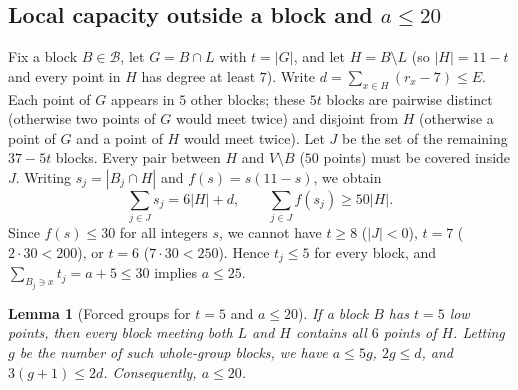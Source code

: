 \documentclass[11pt,a4paper]{article}
\newtheorem{lemma}[theorem]{Lemma}
\theoremstyle{definition}
\theoremstyle{remark}
\begin{document}
\subsection{Local capacity outside a block and \texorpdfstring{$a \le 20$}{a <= 20}}\label{sec:t_le_5}

Fix a block $B \in \mathcal{B}$, let $G = B \cap L$ with $t = |G|$, and let $H = B \setminus L$ (so $|H| = 11 - t$ and every point in $H$ has degree at least $7$). Write $d = \sum_{x \in H} (r_x - 7) \le E$. Each point of $G$ appears in $5$ other blocks; these $5t$ blocks are pairwise distinct (otherwise two points of $G$ would meet twice) and disjoint from $H$ (otherwise a point of $G$ and a point of $H$ would meet twice). Let $J$ be the set of the remaining $37 - 5t$ blocks. Every pair between $H$ and $V \setminus B$ ($50$ points) must be covered inside $J$. Writing $s_j = |B_j \cap H|$ and $f(s) = s(11 - s)$, we obtain
\begin{equation}\label{eq:local_cap}
  \sum_{j \in J} s_j = 6|H| + d, \qquad \sum_{j \in J} f(s_j) \ge 50|H|.
\end{equation}
Since $f(s) \le 30$ for all integers $s$, we cannot have $t \ge 8$ ($|J| < 0$), $t = 7$ ($2 \cdot 30 < 200$), or $t = 6$ ($7 \cdot 30 < 250$). Hence $t_j \le 5$ for every block, and $\sum_{B_j \ni x} t_j = a + 5 \le 30$ implies $a \le 25$.

\begin{lemma}[Forced groups for $t=5$ and $a \le 20$]\label{lem:at_most_20}
If a block $B$ has $t = 5$ low points, then every block meeting both $L$ and $H$ contains all $6$ points of $H$. Letting $g$ be the number of such \emph{whole-group blocks}, we have $a \le 5g$, $2g \le d$, and $3(g+1) \le 2d$. Consequently, $a \le 20$.
\end{lemma}
\end{document}

